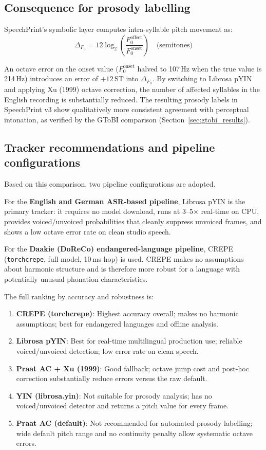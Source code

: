 \subsection{Consequence for prosody labelling}

SpeechPrint's symbolic layer computes intra-syllable pitch movement as:
\begin{equation}
  \Delta_{F_0} = 12 \log_2\!\left(\frac{F_0^{\text{offset}}}{F_0^{\text{onset}}}\right) \quad \text{(semitones)}
\end{equation}

An octave error on the onset value ($F_0^{\text{onset}}$ halved to 107\,Hz when the true value is 214\,Hz) introduces an error of $+12$\,ST into $\Delta_{F_0}$. By switching to Librosa pYIN and applying Xu (1999) octave correction, the number of affected syllables in the English recording is substantially reduced. The resulting prosody labels in SpeechPrint v3 show qualitatively more consistent agreement with perceptual intonation, as verified by the GToBI comparison (Section~\ref{sec:gtobi_results}).

\subsection{Tracker recommendations and pipeline configurations}

Based on this comparison, two pipeline configurations are adopted.

For the \textbf{English and German ASR-based pipeline}, Librosa pYIN is the primary tracker: it requires no model download, runs at 3--5$\times$ real-time on CPU, provides voiced/unvoiced probabilities that cleanly suppress unvoiced frames, and shows a low octave error rate on clean studio speech.

For the \textbf{Daakie (DoReCo) endangered-language pipeline}, CREPE (\texttt{torchcrepe}, full model, 10\,ms hop) is used. CREPE makes no assumptions about harmonic structure and is therefore more robust for a language with potentially unusual phonation characteristics.

The full ranking by accuracy and robustness is:
\begin{enumerate}
\item \textbf{CREPE (torchcrepe)}: Highest accuracy overall; makes no harmonic assumptions; best for endangered languages and offline analysis.
\item \textbf{Librosa pYIN}: Best for real-time multilingual production use; reliable voiced/unvoiced detection; low error rate on clean speech.
\item \textbf{Praat AC + Xu (1999)}: Good fallback; octave jump cost and post-hoc correction substantially reduce errors versus the raw default.
\item \textbf{YIN (librosa.yin)}: Not suitable for prosody analysis; has no voiced/unvoiced detector and returns a pitch value for every frame.
\item \textbf{Praat AC (default)}: Not recommended for automated prosody labelling; wide default pitch range and no continuity penalty allow systematic octave errors.
\end{enumerate}

